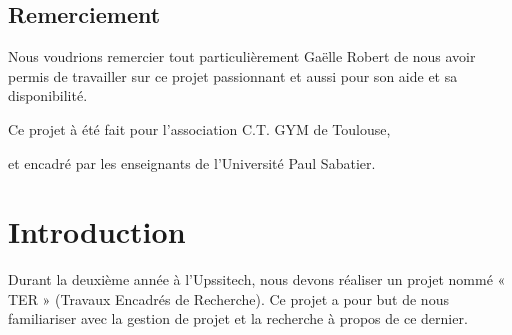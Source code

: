 \documentclass[french]{article}
\begin{document}
\begin{center}
\section*{Remerciement}
    
    Nous voudrions remercier tout particulièrement Gaëlle Robert de nous avoir permis de travailler sur ce projet passionnant et aussi pour son aide et sa disponibilité.
    
    
    \vspace{2cm}
    
    Ce projet à été fait pour l'association C.T. GYM de Toulouse,
    
    
    et encadré par les enseignants de l'Université Paul Sabatier.
    
\end{center}

\newpage

\section*{Introduction}
Durant la deuxième année à l’Upssitech, nous devons réaliser un projet nommé « TER » (Travaux Encadrés de Recherche). Ce projet a pour but de nous familiariser avec la gestion de projet et la recherche à propos de ce dernier.
\end{document}

